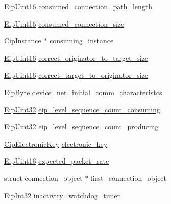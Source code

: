 \begin{DoxyCompactItemize}
\hyperlink{typedefs_8h_ac1b4cfa25b4f5def62f23b455dd395d8}{\-Eip\-Uint16} \hyperlink{structconnection__object_a65eb419da766d2f8a43fc03b14a152f3}{consumed\-\_\-connection\-\_\-path\-\_\-length}
\item 
\hyperlink{typedefs_8h_ac1b4cfa25b4f5def62f23b455dd395d8}{\-Eip\-Uint16} \hyperlink{structconnection__object_a657c244a2fd4dbc4f313470bb635748a}{consumed\-\_\-connection\-\_\-size}
\item 
\hyperlink{ciptypes_8h_aea7976be629e5ece275c993982186188}{\-Cip\-Instance} $\ast$ \hyperlink{structconnection__object_aef7f726017a6d89235c9ee8c0ef98d71}{consuming\-\_\-instance}
\item 
\hyperlink{typedefs_8h_ac1b4cfa25b4f5def62f23b455dd395d8}{\-Eip\-Uint16} \hyperlink{structconnection__object_a5d14bc0c2fbc0b5b80a9d6fdefb4d95e}{correct\-\_\-originator\-\_\-to\-\_\-target\-\_\-size}
\item 
\hyperlink{typedefs_8h_ac1b4cfa25b4f5def62f23b455dd395d8}{\-Eip\-Uint16} \hyperlink{structconnection__object_a35971ed504cab3b06d633738fd48273d}{correct\-\_\-target\-\_\-to\-\_\-originator\-\_\-size}
\item 
\hyperlink{typedefs_8h_a168bac8db7e7e6d944700e1ac4717ae3}{\-Eip\-Byte} \hyperlink{structconnection__object_ab5785c1cdbec9a8fe27ad653c8ffa494}{device\-\_\-net\-\_\-initial\-\_\-comm\-\_\-characteristcs}
\item 
\hyperlink{typedefs_8h_abf2dd49262551294eb990ef8746a2767}{\-Eip\-Uint32} \hyperlink{structconnection__object_afbd9213eab498a24101461bd504edfa6}{eip\-\_\-level\-\_\-sequence\-\_\-count\-\_\-consuming}
\item 
\hyperlink{typedefs_8h_abf2dd49262551294eb990ef8746a2767}{\-Eip\-Uint32} \hyperlink{structconnection__object_aa31634b17dcfdd7d98ad8b4219558dbf}{eip\-\_\-level\-\_\-sequence\-\_\-count\-\_\-producing}
\item 
\hyperlink{structCipElectronicKey}{\-Cip\-Electronic\-Key} \hyperlink{structconnection__object_abe23c92282c8d23c2218f3a5a73a9b5d}{electronic\-\_\-key}
\item 
\hyperlink{typedefs_8h_ac1b4cfa25b4f5def62f23b455dd395d8}{\-Eip\-Uint16} \hyperlink{structconnection__object_ae6744745719b245f03208fc6549e42b4}{expected\-\_\-packet\-\_\-rate}
\item 
struct \hyperlink{structconnection__object}{connection\-\_\-object} $\ast$ \hyperlink{structconnection__object_ac9ff98e4743a376aadb9de2ef521ca83}{first\-\_\-connection\-\_\-object}
\item 
\hyperlink{typedefs_8h_a3d850c4594f24c4fa1f1782e1034ee71}{\-Eip\-Int32} \hyperlink{structconnection__object_a1e067932a0af6b123f37c7e340f1b6df}{inactivity\-\_\-watchdog\-\_\-timer}

\end{DoxyCompactItemize}
